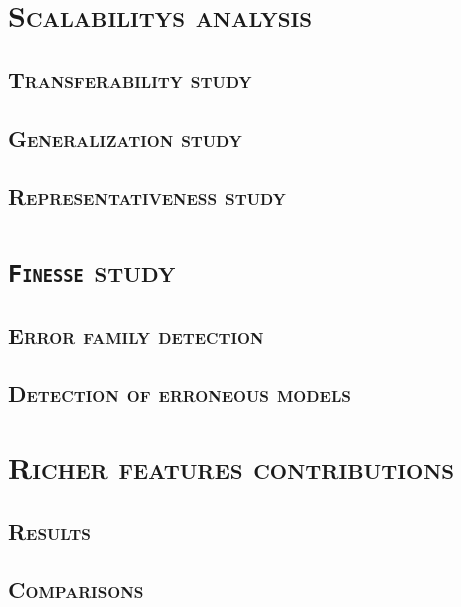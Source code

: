 \minitoc

\vfill

\clearpage

\section{\textsc{Scalabilitys analysis}}
    \subsection{\textsc{Transferability study}}
        \subsubsection{\textsc{}}
        \subsubsection{\textsc{}}
        \subsubsection{\textsc{}}
    \subsection{\textsc{Generalization study}}
        \subsubsection{\textsc{}}
        \subsubsection{\textsc{}}
        \subsubsection{\textsc{}}
    \subsection{\textsc{Representativeness study}}
        \subsubsection{\textsc{}}

\section{\textsc{\texttt{Finesse} study}}
    \subsection{\textsc{Error family detection}}
    \subsection{\textsc{Detection of erroneous models}}

\section{\textsc{Richer features contributions}}
    \subsection{\textsc{Results}}
    \subsection{\textsc{Comparisons}}
